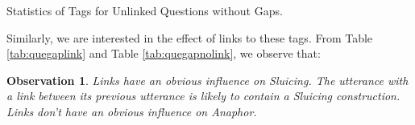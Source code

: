 \documentclass[bsc,frontabs,twoside,singlespacing,parskip,deptreport]{infthesis}     %
\newtheorem{observation}{Observation}[chapter]
\begin{document}
\begin{minipage}{\textwidth}
\begin{minipage}[t]{0.45\textwidth}
        \end{minipage}
        \begin{minipage}[t]{0.45\textwidth}
        \centering
        \makeatletter{}\makeatother


\caption{Statistics of Tags for Unlinked Questions without Gaps.}
\label{tab:quegapnolink}

        \end{minipage}
    \end{minipage}


Similarly, we are interested in the effect of links to these tags. From Table \ref{tab:quegaplink} and Table \ref{tab:quegapnolink}, we observe that:

\begin{observation}
Links have an obvious influence on Sluicing. The utterance with a link between its previous utterance is likely to contain a Sluicing construction. Links don't have an obvious influence on Anaphor.
\end{observation}
\end{document}

